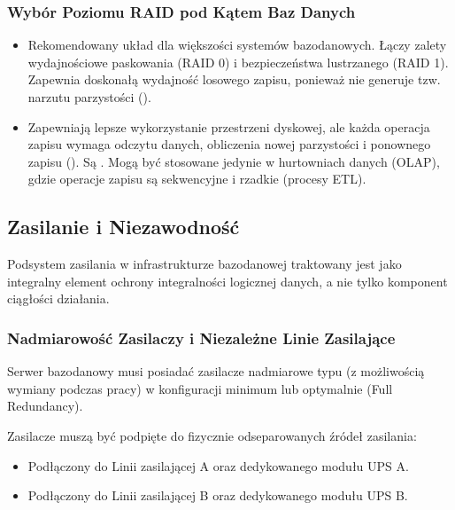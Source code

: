 \documentclass[letterpaper,10pt,polish]{sphinxmanual}
\begin{document}
\subsubsection{Wybór Poziomu RAID pod Kątem Baz Danych}
\label{\detokenize{rozdzia_u0142_2/rozdzia_u0142_21/index:wybor-poziomu-raid-pod-katem-baz-danych}}\begin{itemize}
\item {} 
\sphinxAtStartPar
{} Rekomendowany układ dla większości systemów bazodanowych. Łączy zalety wydajnościowe paskowania (RAID 0) i bezpieczeństwa lustrzanego (RAID 1). Zapewnia doskonałą wydajność losowego zapisu, ponieważ nie generuje tzw. narzutu parzystości ().

\item {} 
\sphinxAtStartPar
{} Zapewniają lepsze wykorzystanie przestrzeni dyskowej, ale każda operacja zapisu wymaga odczytu danych, obliczenia nowej parzystości i ponownego zapisu (). Są . Mogą być stosowane jedynie w hurtowniach danych (OLAP), gdzie operacje zapisu są sekwencyjne i rzadkie (procesy ETL).

\end{itemize}


\subsection{Zasilanie i Niezawodność}
\label{\detokenize{rozdzia_u0142_2/rozdzia_u0142_21/index:zasilanie-i-niezawodnosc}}
\sphinxAtStartPar
Podsystem zasilania w infrastrukturze bazodanowej traktowany jest jako integralny element ochrony integralności logicznej danych, a nie tylko komponent ciągłości działania.


\subsubsection{Nadmiarowość Zasilaczy i Niezależne Linie Zasilające}
\label{\detokenize{rozdzia_u0142_2/rozdzia_u0142_21/index:nadmiarowosc-zasilaczy-i-niezalezne-linie-zasilajace}}
\sphinxAtStartPar
Serwer bazodanowy musi posiadać zasilacze nadmiarowe typu  (z możliwością wymiany podczas pracy) w konfiguracji minimum  lub optymalnie  (Full Redundancy).

\sphinxAtStartPar
Zasilacze muszą być podpięte do fizycznie odseparowanych źródeł zasilania:
\begin{itemize}
\item {} 
\sphinxAtStartPar
{} Podłączony do Linii zasilającej A oraz dedykowanego modułu UPS A.

\item {} 
\sphinxAtStartPar
{} Podłączony do Linii zasilającej B oraz dedykowanego modułu UPS B.

\end{itemize}
\end{document}
